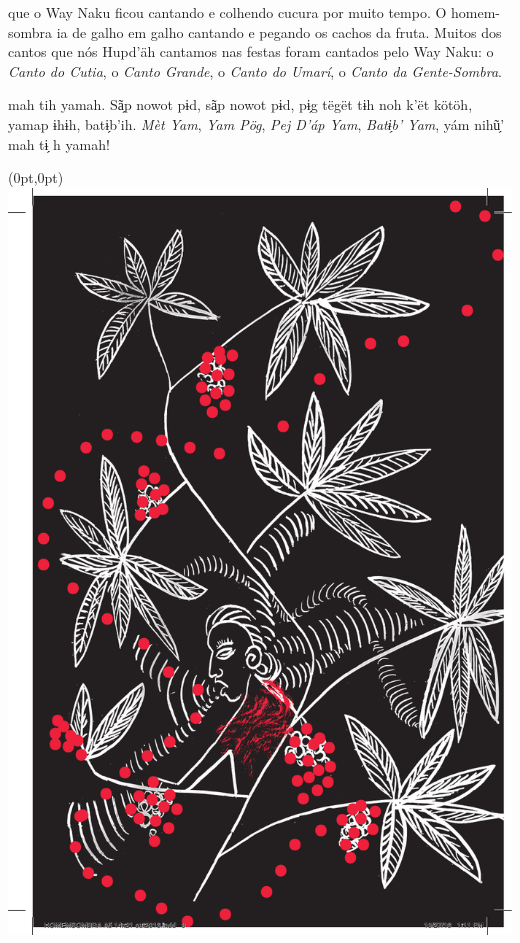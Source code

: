 \mbox{}\vspace*{\fill}

 que o Way Naku ficou
cantando e colhendo cucura
por muito tempo. O homem-sombra
ia de galho em galho
cantando e pegando os cachos
da fruta. Muitos dos cantos
que nós Hupd’äh cantamos nas
festas foram cantados pelo Way
Naku: o \textit{Canto do Cutia}, o \textit{Canto
Grande}, o \textit{Canto do Umarí}, o
\textit{Canto da Gente-Sombra}.

\vspace{2em}

 mah tih yamah. Sã̗p nowot
pɨd, sã̗p nowot pɨd, pɨ̗g tëgët
tɨh noh k’ët kötöh, yamap ɨhɨh,
batɨ̗b’ih. \textit{Mèt Yam}, \textit{Yam Pög}, \textit{Pej
D’áp Yam}, \textit{Batɨ̗b’ Yam}, yám nihũ̗’
mah tɨ̗ h yamah!

\vspace*{\fill}

\pagebreak

\begin{textblock*}{8in}(0pt,0pt)%
\vspace*{-2.8cm}
\hspace*{-3.2cm}\includegraphics[width=153mm]{./imgs/img3.pdf}
\end{textblock*}

